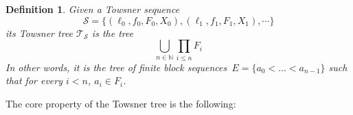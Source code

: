 \documentclass{article}
\def\Tc{\mathcal{T}}
\def\Sc{\mathcal{S}}
\newcommand{\NN}[0]{\mathbb{N}}
\newcommand{\FU}[0]{\mathsf{FU}} %
\numberwithin{theorem}{section}
\newtheorem{proposition}[theorem]{Proposition}
\newtheorem{definition}[theorem]{Definition}
\begin{document}
\begin{definition}
Given a Towsner sequence
$$\Sc = \{(\ell_0, f_0, F_0, X_0), (\ell_1, f_1, F_1, X_1), \cdots \}$$
its \emph{Towsner tree} $\Tc_{\Sc}$ is the tree
$$
\bigcup_{n \in \NN} \prod_{i \leq n} F_i
$$
In other words, it is the tree of finite block sequences~$E = \{ a_0 < \dots < a_{n-1} \}$ such that for every $i < n$, $a_i \in F_i$.
\end{definition}

The core property of the Towsner tree is the following:

\end{document}
